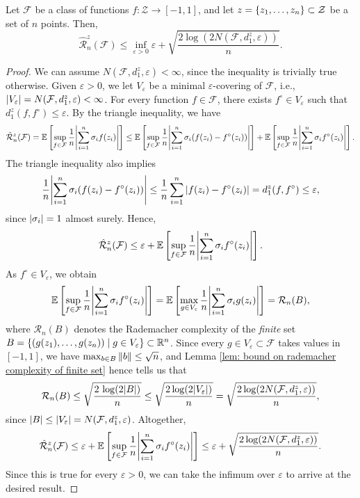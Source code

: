 \begin{theorem}
\label{thm: bound on conditional rademacher average}
Let $\mathcal{F}$ be a class of functions $f \colon \mathcal{Z} \to [-1, 1]$, and let $z = \left\{z_1, \dots, z_n\right\} \subset \mathcal{Z}$ be a set of $n$ points. Then,
\[
    \hat{\mathcal{R}}_n^z(\mathcal{F}) \leq \inf_{\varepsilon > 0} \varepsilon + \sqrt{\frac{2 \log(2 N(\mathcal{F}, d_1^z, \varepsilon))}{n}}.
\]
\end{theorem}

\begin{proof}
We can assume $N(\mathcal{F}, d_1^z, \varepsilon) < \infty$, since the inequality is trivially true otherwise. Given $\varepsilon > 0$, we let $V_{\varepsilon}$ be a minimal $\varepsilon$-covering of $\mathcal{F}$, i.e., $\abs{V_{\varepsilon}} = N(\mathcal{F}, d_1^z, \varepsilon) < \infty$. For every function $f \in \mathcal{F}$, there exists $f^{\circ} \in V_{\varepsilon}$ such that $d_1^z(f, f^{\circ}) \leq \varepsilon$. By the triangle inequality, we have
\[
    \hat{\mathcal{R}}_n^z(\mathcal{F}) = \mathbb{E}\left[ \sup_{f \in \mathcal{F}} \frac{1}{n} \abs{\sum_{i=1}^n \sigma_i f(z_i)} \right] \leq \mathbb{E}\left[ \sup_{f \in \mathcal{F}} \frac{1}{n} \abs{\sum_{i=1}^n \sigma_i ( f(z_i) - f^{\circ}(z_i))} \right] + \mathbb{E}\left[ \sup_{f \in \mathcal{F}} \frac{1}{n} \abs{\sum_{i=1}^n \sigma_i f^{\circ}(z_i)} \right].
\]
The triangle inequality also implies
\[
    \frac{1}{n} \abs{\sum_{i=1}^n \sigma_i ( f(z_i) - f^{\circ}(z_i))} \leq \frac{1}{n} \sum_{i=1}^n \abs{ f(z_i) - f^{\circ}(z_i) } = d_1^z(f, f^{\circ}) \leq \varepsilon,
\]
since $\abs{\sigma_i} = 1$ almost surely. Hence,
\[
    \hat{\mathcal{R}}_n^z(\mathcal{F}) \leq \varepsilon + \mathbb{E}\left[ \sup_{f \in \mathcal{F}} \frac{1}{n} \abs{\sum_{i=1}^n \sigma_i f^{\circ}(z_i)} \right].
\]
As $f^{\circ} \in V_{\varepsilon}$, we obtain
\[
    \mathbb{E}\left[ \sup_{f \in \mathcal{F}} \frac{1}{n} \abs{\sum_{i=1}^n \sigma_i f^{\circ}(z_i)} \right] = \mathbb{E}\left[ \max_{g \in V_{\varepsilon}} \frac{1}{n} \abs{\sum_{i=1}^n \sigma_i g(z_i)} \right] = \mathcal{R}_n(B),
\]
where $\mathcal{R}_n(B)$ denotes the Rademacher complexity of the \emph{finite} set $B = \left\{ (g(z_1), \dots, g(z_n)) \mathrel{|} g \in V_{\varepsilon} \right\} \subset \mathbb{R}^n$. Since every $g \in V_{\varepsilon} \subset \mathcal{F}$ takes values in $[-1, 1]$, we have $\max_{b \in B} \norm{b} \leq \sqrt{n}$, and Lemma \ref{lem: bound on rademacher complexity of finite set} hence tells us that
\[
    \mathcal{R}_n(B) \leq \sqrt{ \frac{2 \, \log(2 \abs{B})}{n} } \leq \sqrt{ \frac{2 \, \mathrm{log}(2 \abs{V_{\varepsilon}})}{n} } = \sqrt{ \frac{2 \, \mathrm{log}(2 N(\mathcal{F}, d_1^z, \varepsilon))}{n} },
\]
since $\abs{B} \leq \abs{V_{\varepsilon}} = N(\mathcal{F}, d_1^z, \varepsilon)$. Altogether,
\[
    \hat{\mathcal{R}}_n^z(\mathcal{F}) \leq \varepsilon + \mathbb{E}\left[ \sup_{f \in \mathcal{F}} \frac{1}{n} \abs{\sum_{i=1}^n \sigma_i f^{\circ}(z_i)} \right] \leq \varepsilon + \sqrt{ \frac{2 \, \mathrm{log}(2 N(\mathcal{F}, d_1^z, \varepsilon))}{n} }.
\]
Since this is true for every $\varepsilon > 0$, we can take the infimum over $\varepsilon$ to arrive at the desired result.
\end{proof}

